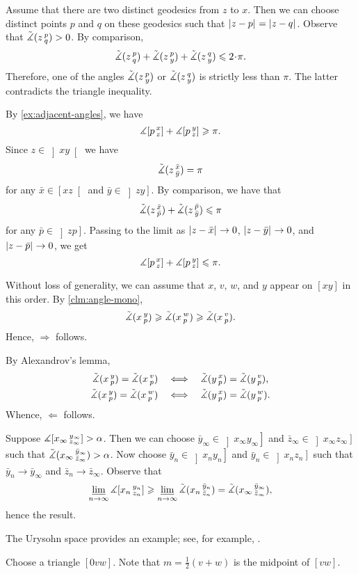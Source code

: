 Assume that there are two distinct geodesics from $z$ to $x$.
Then we can choose distinct points $p$ and $q$ on these geodesics such that $|{z}-{p}|_{}^{{}}=|{z}-{q}|_{}^{{}}$.
Observe that $\tilde\measuredangle(z\,{}^{p}_{q})>0$.
By comparison,
\[\angk zpq+\angk zpy+\angk zqy\le 2\cdot\pi.\]
Therefore, one of the angles $\tilde\measuredangle(z\,{}^{p}_{y})$ or $\tilde\measuredangle(z\,{}^{q}_{y})$ is strictly less than $\pi$.
The latter contradicts the triangle inequality.

By \ref{ex:adjacent-angles}, we have
\[\measuredangle[p\,{}^{x}_{z}]+\measuredangle[p\,{}^{y}_{z}]\geqslant \pi.\]
Since $z\in \left]xy\right[$ we have 
\[\tilde\measuredangle(z\,{}^{\bar x}_{\bar y})=\pi\]
for any $\bar x\in \left[xz\right[$ and $\bar y\in \left]zy\right]$.
By comparison, we have that 
\[\tilde\measuredangle(z\,{}^{\bar x}_{\bar p})+\tilde\measuredangle(z\,{}^{\bar p}_{\bar y})\leqslant\pi\]
for any $\bar p\in \left]zp\right]$.
Passing to the limit as
$|{z}-{\bar x}|_{}^{{}}\to 0$,
$|{z}-{\bar y}|_{}^{{}}\to 0$, and
$|{z}-{\bar p}|_{}^{{}}\to 0$,
we get \[\measuredangle[p\,{}^{x}_{z}]+\measuredangle[p\,{}^{y}_{z}]\leqslant \pi.\]

Without loss of generality, we can assume that $x$, $v$, $w$, and $y$ appear on 
$[xy]$ in this order.
By \ref{clm:angle-mono},
\[
\tilde\measuredangle(x\,{}^{y}_{p})\geqslant \tilde\measuredangle(x\,{}^{w}_{p}) \geqslant\tilde\measuredangle(x\,{}^{v}_{p}).
\]
Hence, $\Rightarrow$ follows.

By Alexandrov's lemma,
\begin{align*}
\tilde\measuredangle(x\,{}^{y}_{p})=\tilde\measuredangle(x\,{}^{v}_{p})
\quad&\Longleftrightarrow\quad
\tilde\measuredangle(y\,{}^{x}_{p})=\tilde\measuredangle(y\,{}^{v}_{p}),
\\
\tilde\measuredangle(x\,{}^{y}_{p})=\tilde\measuredangle(x\,{}^{w}_{p})
\quad&\Longleftrightarrow\quad
\tilde\measuredangle(y\,{}^{x}_{p})=\tilde\measuredangle(y\,{}^{w}_{p}).
\end{align*}
Whence, $\Leftarrow$ follows.

 Suppose $\measuredangle [x_\infty\,{}^{y_\infty}_{z_\infty}]>\alpha$.
Then we can choose $\bar y_\infty\in\left]x_\infty y_\infty\right]$
and $\bar z_\infty\in\left]x_\infty z_\infty\right]$ such that 
$\tilde\measuredangle(x_\infty\,{}^{\bar y_\infty}_{\bar z_\infty})>\alpha$.
Now choose $\bar y_n\in\left]x_n y_n\right]$ and $\bar y_n\in\left]x_n z_n\right]$ such that $\bar y_n\to \bar y_\infty$ and $\bar z_n\to \bar z_\infty$.
Observe that 
\[\varliminf_{n\to\infty}\measuredangle [x_n\,{}^{y_n}_{z_n}]\geqslant\varliminf_{n\to\infty}\tilde\measuredangle(x_n\,{}^{\bar y_n}_{\bar z_n}) = \tilde\measuredangle(x_\infty\,{}^{\bar y_\infty}_{\bar z_\infty}),\]
hence the result.

The Urysohn space provides an example;
see, for example, \cite[Lecture 2]{petrunin2023pure}.

Choose a triangle $[0vw]$.
Note that $m=\tfrac12(v+w)$ is the midpoint of $[vw]$.

